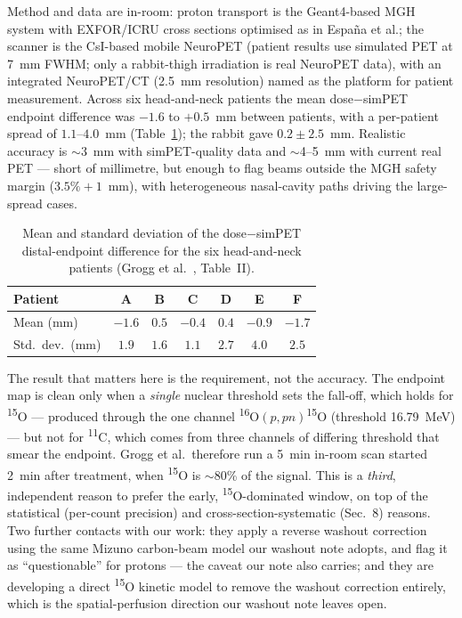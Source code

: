 \documentclass[11pt]{article}
\newcommand{\iso}[2]{\textsuperscript{#1}#2}
\begin{document}
Method and data are in-room: proton transport is the Geant4-based MGH system
with EXFOR/ICRU cross sections optimised as in Espa\~na et al.; the scanner is
the CsI-based mobile NeuroPET (patient results use simulated PET at 7~mm FWHM;
only a rabbit-thigh irradiation is real NeuroPET data), with an integrated
NeuroPET/CT (2.5~mm resolution) named as the platform for patient measurement.
Across six head-and-neck patients the mean dose$-$simPET endpoint difference was
$-1.6$ to $+0.5$~mm between patients, with a per-patient spread of $1.1$--$4.0$~mm
(Table~\ref{tab:grogg}); the rabbit gave $0.2 \pm 2.5$~mm. Realistic accuracy is
$\sim$3~mm with simPET-quality data and $\sim$4--5~mm with current real PET ---
short of millimetre, but enough to flag beams outside the MGH safety margin
($3.5\% + 1$~mm), with heterogeneous nasal-cavity paths driving the large-spread
cases.

\begin{table}[h]
  \centering
  \caption{Mean and standard deviation of the dose$-$simPET distal-endpoint
    difference for the six head-and-neck patients (Grogg et
    al.~\cite{grogg2013}, Table~II).}
  \label{tab:grogg}
  \begin{tabular}{lcccccc}
    \toprule
    Patient & A & B & C & D & E & F \\
    \midrule
    Mean (mm)    & $-1.6$ & $0.5$ & $-0.4$ & $0.4$ & $-0.9$ & $-1.7$ \\
    Std.\ dev.\ (mm) & $1.9$ & $1.6$ & $1.1$ & $2.7$ & $4.0$ & $2.5$ \\
    \bottomrule
  \end{tabular}
\end{table}

\noindent
The result that matters here is the requirement, not the accuracy. The endpoint
map is clean only when a \emph{single} nuclear threshold sets the fall-off, which
holds for \iso{15}{O} --- produced through the one channel
\iso{16}{O}$(p,pn)$\iso{15}{O} (threshold 16.79~MeV) --- but not for \iso{11}{C},
which comes from three channels of differing threshold that smear the endpoint.
Grogg et al.\ therefore run a 5~min in-room scan started 2~min after treatment,
when \iso{15}{O} is $\sim$80\% of the signal. This is a \emph{third}, independent
reason to prefer the early, \iso{15}{O}-dominated window, on top of the
statistical (per-count precision) and cross-section-systematic (Sec.~8) reasons.
Two further contacts with our work: they apply a reverse washout correction using
the same Mizuno carbon-beam model our washout note adopts, and flag it as
``questionable'' for protons --- the caveat our note also carries; and they are
developing a direct \iso{15}{O} kinetic model to remove the washout correction
entirely, which is the spatial-perfusion direction our washout note leaves open.
\end{document}
